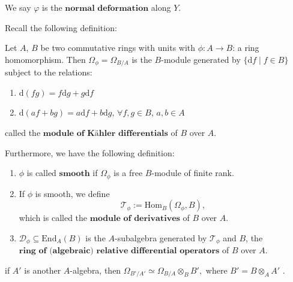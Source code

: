 We say $\varphi$ is the $\textbf{normal deformation}$ along $Y$.

Recall the following definition:

\begin{definition}
    Let $A$, $B$ be two commutative rings with units with $\phi: A \to B$: a ring homomorphism. Then $\Omega_{\phi} = \Omega_{B/A}$ is the $B$-module generated by $\{\mathrm{d}f \mid f \in B\}$ subject to the relations:
    \begin{enumerate}
        \item  $\mathrm{d}(fg) = f\mathrm{d}g + g\mathrm{d}f$
        \item $\mathrm{d}(af + bg) = a\mathrm{d}f + b\mathrm{d}g, \, \forall f,g \in B$, $a,b \in A$
    \end{enumerate}
    called the $\textbf{module of K\"{a}hler differentials}$ of $B$ over $A$.
\end{definition}

Furthermore, we have the following definition:

\begin{definition}

    \begin{enumerate}
        \item  $\phi$ is called $\textbf{smooth}$\label{def:smooth-morphism} if $\Omega_{\phi}$ is a free $B$-module of finite rank.
        \item If $\phi$ is smooth, we define $$\mathcal{T}_{\phi} := \mathrm{Hom}_B(\Omega_{\phi}, B),$$which is called the $\textbf{module of derivatives}$ of $B$ over $A$.
        \item $\mathcal{D}_{\phi} \subseteq \mathrm{End}_A(B)$ is the $A$-subalgebra generated by $\mathcal{T}_{\phi}$ and $B$, the $\textbf{ring of (algebraic) relative differential operators}$ of $B$ over $A$.
    \end{enumerate}

\end{definition}

\begin{remark}
    if $A'$ is another $A$-algebra, then $\Omega_{B'/A'} \simeq \Omega_{B/A} \otimes_B B',$ where $B' = B \otimes_A A'$ \cite[\href{https://stacks.math.columbia.edu/tag/00RV}{Tag 00RV}]{stacks-project}.
\end{remark}

